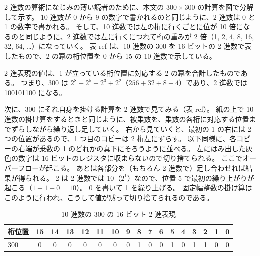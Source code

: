 \documentclass[uplatex]{jsarticle}
\def\ref#1{ref}%
\def\label#1{}%
\begin{document}
\begin{rem}\label{rem:ch9-binary-refresher}
2 進数の算術になじみの薄い読者のために、本文の $300 \times 300$ の計算を図で分解して示す。
10 進数が 0 から 9 の数字で書かれるのと同じように、2 進数は 0 と 1 の数字で書かれる。
そして、10 進数では左の桁に行くごとに位が 10 倍になるのと同じように、2 進数では左に行くにつれて桁の重みが 2 倍（1, 2, 4, 8, 16, 32, 64, \ldots）になっていく。
表 \ref{tab:ch9-binary-300} は、10 進数の 300 を 16 ビットの 2 進数で表したもので、2 の冪の桁位置を 0 から 15 の 10 進数で示している。

2 進表現の値は、1 が立っている桁位置に対応する 2 の冪を合計したものである。
つまり、300 は $2^8 + 2^5 + 2^3 + 2^2$（$256 + 32 + 8 + 4$）であり、2 進数では 100101100 になる。

次に、300 にそれ自身を掛ける計算を 2 進数で見てみる（表 \ref{tab:ch9-binary-multiplication}）。
紙の上で 10 進数の掛け算をするときと同じように、被乗数を、乗数の各桁に対応する位置までずらしながら繰り返し足していく。
右から見ていくと、最初の 1 の右には 2 つの位置があるので、1 つ目のコピーは 2 桁左にずらす。
以下同様に、各コピーの右端が乗数の 1 のどれかの真下にそろうように並べる。
左にはみ出した灰色の数字は 16 ビットのレジスタに収まらないので切り捨てられる。
ここでオーバーフローが起こる。
あとは各部分を（もちろん 2 進数で）足し合わせれば結果が得られる。
2 は 2 進数では 10（$2^1$）なので、位置 5 で最初の繰り上がりが起こる（$1+1+0 = 10$）。
0 を書いて 1 を繰り上げる。
固定幅整数の掛け算はこのように行われ、こうして値が黙って切り捨てられるのである。
\end{rem}

\begin{table}[H]
\centering
\small
\setlength{\tabcolsep}{3pt}
\begin{tabular}{l|*{16}{c}}
桁位置 & 15 & 14 & 13 & 12 & 11 & 10 & 9 & 8 & 7 & 6 & 5 & 4 & 3 & 2 & 1 & 0 \\ \hline
300 & 0 & 0 & 0 & 0 & 0 & 0 & 0 & 1 & 0 & 0 & 1 & 0 & 1 & 1 & 0 & 0 \\
\end{tabular}
\caption{10 進数の 300 の 16 ビット 2 進表現}\label{tab:ch9-binary-300}
\end{table}
\end{document}
